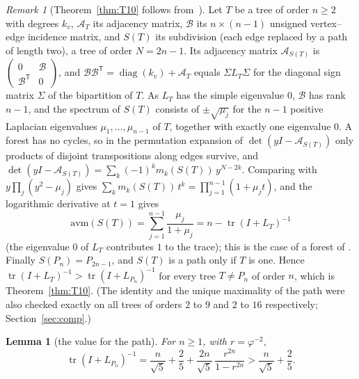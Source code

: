 \documentclass[11pt]{amsart}
\newtheorem{lemma}[theorem]{Lemma}
\theoremstyle{definition}
\theoremstyle{remark}
\newtheorem{remark}[theorem]{Remark}
\newcommand{\tr}{\operatorname{tr}}
\newcommand{\diag}{\operatorname{diag}}
\newcommand{\T}{\mathsf T}
\begin{document}
\begin{remark}[Theorem~\ref{thm:T10} follows from~\cite{AMW}]
Let $T$ be a tree of order $n\ge2$ with degrees $k_v$, $\mathcal A_T$ its
adjacency matrix, $\mathcal B$ its $n\times(n-1)$ unsigned vertex--edge
incidence matrix, and $S(T)$ its subdivision (each edge replaced by a path
of length two), a tree of order $N=2n-1$. Its adjacency matrix
$\mathcal A_{S(T)}$ is
$\left(\begin{smallmatrix}0&\mathcal B\\\mathcal B^\T&0\end{smallmatrix}\right)$,
and $\mathcal B\mathcal B^\T=\diag(k_v)+\mathcal A_T$ equals $\Sigma L_T\Sigma$
for the diagonal sign matrix $\Sigma$ of the bipartition of $T$. As $L_T$ has
the simple eigenvalue $0$, $\mathcal B$ has rank $n-1$, and the spectrum of
$S(T)$ consists of
$\pm\sqrt{\mu_j}$ for the $n-1$ positive Laplacian eigenvalues
$\mu_1,\dots,\mu_{n-1}$ of $T$, together with exactly one eigenvalue $0$. A
forest has no cycles, so in the permutation expansion of
$\det(yI-\mathcal A_{S(T)})$ only products of disjoint transpositions along
edges survive, and $\det(yI-\mathcal A_{S(T)})=\sum_k(-1)^km_k(S(T))\,y^{N-2k}$. Comparing with
$y\prod_j(y^2-\mu_j)$ gives $\sum_km_k(S(T))\,t^k=\prod_{j=1}^{n-1}(1+\mu_jt)$,
and the logarithmic derivative at $t=1$ gives
\[
\mathrm{avm}(S(T))=\sum_{j=1}^{n-1}\frac{\mu_j}{1+\mu_j}=n-\tr(I+L_T)^{-1}
\]
(the eigenvalue $0$ of $L_T$ contributes $1$ to the trace); this is the case
of a forest of \cite[Lemma~5.1]{AMW}. Finally $S(P_n)=P_{2n-1}$, and $S(T)$
is a path only if $T$ is one. Hence $\tr(I+L_T)^{-1}>\tr(I+L_{P_n})^{-1}$ for
every tree $T\ne P_n$ of order $n$, which is Theorem~\ref{thm:T10}.
(The identity and the unique maximality of the path were also checked
exactly on all trees of orders $2$ to $9$ and $2$ to $16$ respectively;
Section~\ref{sec:comp}.)
\end{remark}

\begin{lemma}[the value for the path]\label{lem:S46}
For $n\ge1$, with $r=\varphi^{-2}$,
\[
\tr(I+L_{P_n})^{-1}=\frac{n}{\sqrt5}+\frac25+\frac{2n}{\sqrt5}\,\frac{r^{2n}}{1-r^{2n}}>\frac{n}{\sqrt5}+\frac25 .
\]
\end{lemma}
\end{document}
